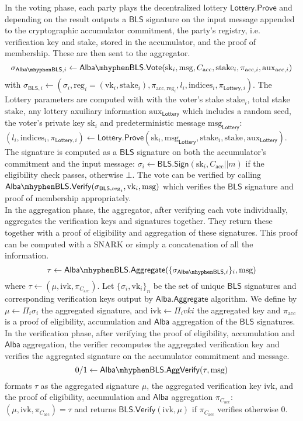 \documentclass{article}
\newcommand{\vk}[1]{\ensuremath{\textrm{vk}_{#1}}\xspace}
\newcommand{\sk}[1]{\ensuremath{\textrm{sk}_{#1}}\xspace}
\newcommand{\m}{\ensuremath{\textrm{msg}}\xspace}
\newcommand{\acc}{\ensuremath{\textrm{acc}}\xspace}
\newcommand{\aux}{\ensuremath{\textrm{aux}}\xspace}
\newcommand{\reg}[1]{\ensuremath{\textrm{reg}_{#1}}\xspace}
\newcommand{\stake}[1]{\ensuremath{\textrm{stake}_{#1}}\xspace}
\newcommand{\indices}[1]{\ensuremath{\textrm{indices}_{#1}}\xspace}
\newcommand{\ivk}{\ensuremath{\textrm{ivk}}\xspace}
\newcommand{\BLS}{\ensuremath{\mathsf{BLS}}\xspace}
\newcommand{\Alba}{\ensuremath{\mathsf{Alba}}\xspace}
\newcommand{\Lottery}{\ensuremath{\mathsf{Lottery}}\xspace}
\newcommand{\Vote}{\ensuremath{\mathsf{Vote}}\xspace}
\newcommand{\AlbaBls}{\ensuremath{\mathsf{Alba}\mhyphen\mathsf{BLS}\xspace}}
\newcommand{\Sign}{\ensuremath{\mathsf{Sign}}\xspace}
\newcommand{\Verify}{\ensuremath{\mathsf{Verify}}\xspace}
\newcommand{\Aggregate}{\ensuremath{\mathsf{Aggregate}}\xspace}
\newcommand{\AggVerify}{\ensuremath{\mathsf{AggVerify}}\xspace}
\newcommand{\Prove}{\ensuremath{\mathsf{Prove}}\xspace}
\begin{document}
In the voting phase, each party plays the decentralized lottery \Lottery.\Prove and depending on the result outputs a \BLS signature on the input message appended to the cryptographic accumulator commitment, the party's registry, i.e. verification key and stake, stored in the accumulator, and the proof of membership. These are then sent to the aggregator.
$$
\sigma_{\AlbaBls, i} \leftarrow \AlbaBls.\Vote(\sk{i}, \m, C_\acc, \stake{i}, \pi_{\acc, i}, \aux_{\acc, i})
$$
with $ \sigma_{\BLS, i} \leftarrow (\sigma_i, \reg{i}=(\vk{i}, \stake{i}), \pi_{\acc, \reg{i}}, l_i, \indices{i}, \pi_{\Lottery, i})$. The Lottery parameters are computed with with the voter's stake $\stake{i}$, total stake $\stake{}$, any lottery axuiliary information $\aux_\Lottery$ which includes a random seed, the voter's private key $\sk{i}$ and predeterministic message $\m_\Lottery$: $(l_i, \indices{i}, \pi_{\Lottery, i}) \leftarrow \Lottery.\Prove(\sk{i}, \m_\Lottery, \stake{i}, \stake{}, \aux_\Lottery)$. The signature is computed as a \BLS signature on both the accumulator's commitment and the input message: $\sigma_i \leftarrow \BLS.\Sign(\sk{i}, C_\acc || m)$ if the eligibility check passes, otherwise $\bot$.
The vote can be verified by calling $\AlbaBls.\Verify(\sigma_{\BLS, \reg{i}}, \vk{i}, \m)$ which verifies the \BLS signature and proof of membership appropriately.\\

In the aggregation phase, the aggregator, after verifying each vote individually, aggregates the verification keys and signatures together. They return these together with a proof of eligibility and aggregation of these signatures. This proof can be computed with a SNARK or simply a concatenation of all the information.
$$
\tau \leftarrow \AlbaBls.\Aggregate(\{\sigma_{\AlbaBls,i}\}_i, \m)
$$
where $\tau \leftarrow (\mu, \ivk, \pi_{C_\acc})$. Let $\{\sigma_i, \vk{i}\}_n$ be the set of unique \BLS signatures and corresponding verification keys output by \Alba.\Aggregate algorithm. We define by $\mu \leftarrow \Pi_i \sigma_i$ the aggregated signature, and $\ivk \leftarrow \Pi_i vk{i}$ the aggregated key and $\pi_\acc$ is a proof of eligibility, accumulation and \Alba aggregation of the \BLS signatures.\\

In the verification phase, after verifying the proof of eligibility, accumulation and \Alba aggregation, the verifier recomputes the aggregated verification key and verifies the aggregated signature on the accumulator commitment and message.
$$
0/1 \leftarrow \AlbaBls.\AggVerify(\tau, \m)
$$
formats $\tau$ as the aggregated signature $\mu$, the aggregated verification key $\ivk$, and the proof of eligibility, accumulation and \Alba aggregation $\pi_{C_\acc}$: $(\mu, \ivk, \pi_{C_\acc}) = \tau$ and returns $\BLS.\Verify(\ivk, \mu)$ if $\pi_{C_\acc}$ verifies otherwise 0.\\
\end{document}
